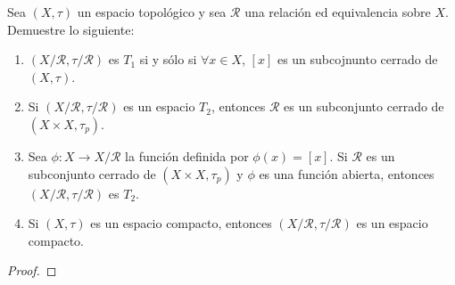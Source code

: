 \documentclass[12pt]{report}
\theoremstyle{largebreak}
\newcommand\cf[3]{\ensuremath{#1:#2\rightarrow#3}}
\begin{document}
    \begin{excer}
        Sea $(X,\tau)$ un espacio topológico y sea $\mathcal{R}$ una relación ed equivalencia sobre $X$. Demuestre lo siguiente:
        \begin{enumerate}
            \item $(X/\mathcal{R},\tau/\mathcal{R})$ es $T_1$ si y sólo si $\forall x\in X$, $[x]$ es un subcojnunto cerrado de $(X,\tau)$.
            \item Si $(X/\mathcal{R},\tau/\mathcal{R})$ es un espacio $T_2$, entonces $\mathcal{R}$ es un subconjunto cerrado de $(X\times X,\tau_p)$.
            \item Sea $\cf{\phi}{X}{X/\mathcal{R}}$ la función definida por $\phi(x)=[x]$. Si $\mathcal{R}$ es un subconjunto cerrado de $(X\times X,\tau_p )$ y $\phi$ es una función abierta, entonces $(X/\mathcal{R},\tau/\mathcal{R})$ es $T_2$.
            \item Si $(X,\tau)$ es un espacio compacto, entonces $(X/\mathcal{R},\tau/\mathcal{R})$ es un espacio compacto.
        \end{enumerate}
    \end{excer}

    \begin{proof}
        
    \end{proof}
\end{document}
